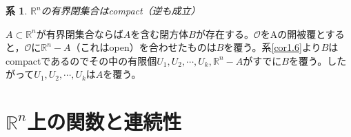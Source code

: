 \documentclass[dvipdfmx,a4j,10pt]{jsarticle}
\makeatletter
\theoremstyle{mystyle1}
\newtheorem{cor}[dfn]{系}
\theoremstyle{mystyle2}
\renewenvironment{proof}[1][\proofname]{\par
  \pushQED{\qed}%
  \normalfont
  \topsep6\p@\@plus6\p@ \trivlist
  \item[\hskip\labelsep{\bfseries\sffamily #1}]\ignorespaces
}{%
  \popQED\endtrivlist\@endpefalse
}
\renewcommand\proofname{証明}
\makeatother
\begin{document}
\begin{framed}
    \begin{cor}
        $\mathbb{R}^n$の有界閉集合はcompact（逆も成立）
    \end{cor}
\end{framed}

\begin{proof}
    $A\subset\mathbb{R}^n$が有界閉集合ならば$A$を含む閉方体$B$が存在する。$\mathscr{O}$をAの開被覆とすると，$\mathscr{O}$に$\mathbb{R}^n-A$（これはopen）を合わせたものは$B$を覆う。系\ref{cor1.6}より$B$はcompactであるのでその中の有限個$U_1,U_2,\cdots,U_k,\mathbb{R}^n-A$がすでに$B$を覆う。したがって$U_1,U_2,\cdots,U_k$は$A$を覆う。
\end{proof}


\newpage


\section{$\mathbb{R}^n$上の関数と連続性}
\end{document}
